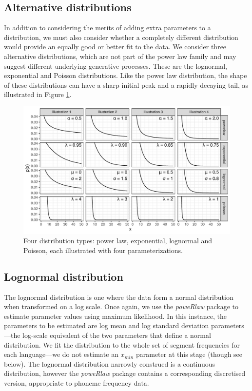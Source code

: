 \hypertarget{alternative-distributions}{%
\subsection{Alternative distributions}\label{alternative-distributions}}

In addition to considering the merits of adding extra parameters to a distribution, we must also consider whether a completely different distribution would provide an equally good or better fit to the data. We consider three alternative distributions, which are not part of the power law family and may suggest different underlying generative processes. These are the lognormal, exponential and Poisson distributions. Like the power law distribution, the shape of these distributions can have a sharp initial peak and a rapidly decaying tail, as illustrated in Figure \ref{fig:Figure-3}.

\begin{figure}

{\centering \includegraphics[width=180mm]{03-phoneme-frequencies/fig/Fig3_distribution_illustrations} 

}

\caption{Four distribution types: power law, exponential, lognormal and Poisson, each illustrated with four parameterizations.}\label{fig:Figure-3}
\end{figure}

\hypertarget{lognormal-distribution}{%
\subsection{Lognormal distribution}\label{lognormal-distribution}}

The lognormal distribution is one where the data form a normal distribution when transformed on a log scale. Once again, we use the \emph{poweRlaw} package \autocite{gillespie_fitting_2014} to estimate parameter values using maximum likelihood. In this instance, the parameters to be estimated are log mean and log standard deviation parameters---the log-scale equivalent of the two parameters that define a normal distribution. We fit the distribution to the whole set of segment frequencies for each language---we do not estimate an \(x_{min}\) parameter at this stage (though see below). The lognormal distribution narrowly construed is a continuous distribution, however the \emph{poweRlaw} package contains a corresponding discretised version, appropriate to phoneme frequency data.

